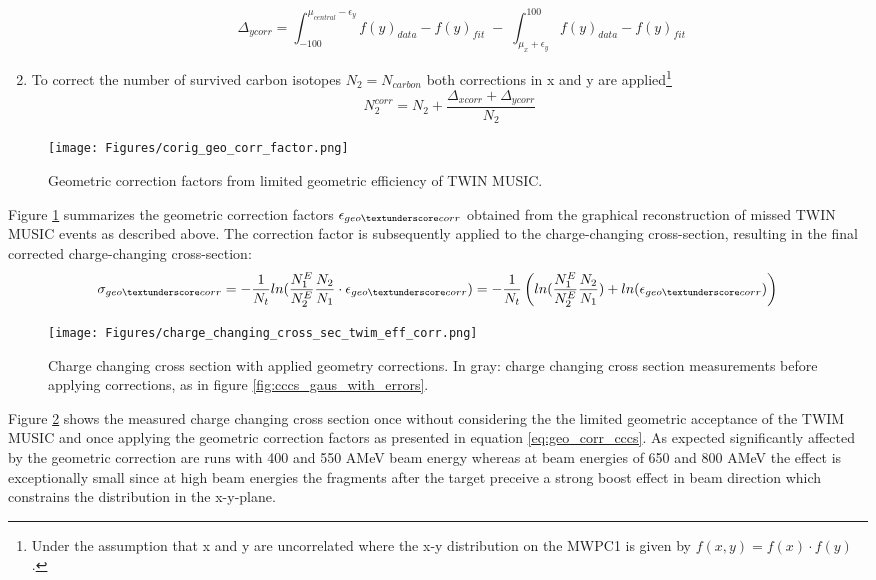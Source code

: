 \begin{enumerate}
\begin{enumerate}
\begin{equation}
\Delta_{ycorr} = \int_{-100}^{\mu_{central} - \epsilon_y} f(y)_{data} - f(y)_{fit} \; - \; \int_{\mu_x + \epsilon_y}^{100} f(y)_{data} - f(y)_{fit} 
\end{equation}
\end{enumerate}
\item To correct the number of survived carbon isotopes $N_2 = N_{carbon}$ both corrections in x and y are applied\footnote{Under the assumption that x and y are uncorrelated where the x-y distribution on the MWPC1 is given by $f(x,y) = f(x)\cdot f(y)$.}
\begin{equation}
N_2^{corr} = N_2 +\frac{\Delta_{xcorr}+\Delta_{ycorr}}{N_2}
\end{equation}
\end{enumerate}
\begin{figure}[htpb]
    \centering
    \texttt{[image: Figures/corig\_geo\_corr\_factor.png]}
    \caption{
    Geometric correction factors from limited geometric efficiency of TWIN MUSIC. 
     }
    \label{fig:geo_corr_twim}
\end{figure}
Figure \ref{fig:geo_corr_twim} summarizes the geometric correction factors $\epsilon_{geo\textunderscore corr}$ obtained from the graphical reconstruction of missed TWIN MUSIC events as described above. The correction factor is subsequently applied to the charge-changing cross-section, resulting in the final corrected charge-changing cross-section:
\begin{equation}
\sigma_{geo\textunderscore corr} = -\frac{1}{N_t} ln(\frac{N_{1}^E}{N_{2}^E}\frac{N_2}{N_1}\cdot \epsilon_{geo\textunderscore corr}) = -\frac{1}{N_t} \left( ln(\frac{N_{1}^E}{N_{2}^E}\frac{N_2}{N_1}) + ln(\epsilon_{geo\textunderscore corr})\right)
\label{eq:geo_corr_cccs}
\end{equation}
\begin{figure}[htpb]
    \centering
    \texttt{[image: Figures/charge\_changing\_cross\_sec\_twim\_eff\_corr.png]}
    \caption{
    Charge changing cross section with applied geometry corrections. In gray: charge changing cross section measurements before applying corrections, as in figure \ref{fig:cccs_gaus_with_errors}. 
     }
    \label{fig:geo_corr_cross_sec}
\end{figure}
Figure \ref{fig:geo_corr_cross_sec} shows the measured charge changing cross section once without considering the the limited geometric acceptance of the TWIM MUSIC and once applying the geometric correction factors as presented in equation \ref{eq:geo_corr_cccs}. As expected significantly affected by the  geometric correction are runs with 400 and 550 AMeV beam energy whereas at beam energies of 650 and 800 AMeV the effect is exceptionally small since at high beam energies  the fragments after the target preceive a strong boost effect in beam direction which constrains the distribution in the x-y-plane.

